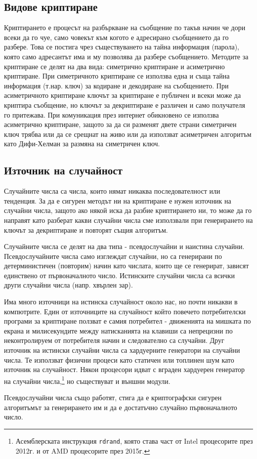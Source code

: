\subsection{Видове криптиране}
Криптирането е процесът на разбъркване на съобщение по такъв начин че дори всеки да го чуе, само човекът към когото е адресирано съобщението да го разбере. Това се постига чрез съществуването на тайна информация (парола), която само адресантът има и му позволява да разбере съобщението. Методите за криптиране се делят на два вида: симетрично криптиране и асиметрично криптиране. При симетричното криптиране се използва една и съща тайна информация (т.нар. ключ) за кодиране и декодиране на съобщението. При асиметричното криптиране ключът за криптиране е публичен и всеки може да криптира съобщение, но ключът за декриптиране е различен и само получателя го притежава. При комуникация през интернет обикновено се използва асиметрично криптиране, защото за да си разменят двете страни симетричен ключ трябва или да се срещнат на живо или да използват асиметричен алгоритъм като Дифи-Хелман за размяна на симетричен ключ.

\subsection{Източник на случайност}
Случайните числа са числа, които нямат никаква последователност или тенденция. За да е сигурен методът ни на криптиране е нужен източник на случайни числа, защото ако някой иска да разбие криптирането ни, то може да го направят като разберат какви случайни числа сме използвали при генерирането на ключът за декриптиране и повторят същия алгоритъм.

Случайните числа се делят на два типа - псевдослучайни и наистина случайни. Псевдослучайните числа само изглеждат случайни, но са генерирани по детерминистичен (повторим) начин като числата, които ще се генерират, зависят единствено от първоначалното число. Истинските случайни числа са всички други случайни числа (напр. хвърлен зар).

Има много източници на истинска случайност около нас, но почти никакви в компютрите. Един от източниците на случайност който повечето потребителски програми за криптиране ползват е самия потребител - движенията на мишката по екрана и милисекундите между натисканията на клавиши са непрецизни по неконтролируем от потребителя начин и следователно са случайни. Друг източник на истински случайни числа са хардуерните генератори на случайни числа. Те използват физични процеси като статичен или топлинен шум като източник на случайност. Някои процесори идват с вграден хардуерен генератор на случайни числа,\footnote{Асемблерската инструкция {\tt rdrand}, която става част от Intel процесорите през 2012г. и от AMD процесорите през 2015г.} но съществуват и външни модули.

Псевдослучайни числа също работят, стига да е криптографски сигурен алгоритъмът за генерирането им и да е достатъчно случайно първоначалното число.

